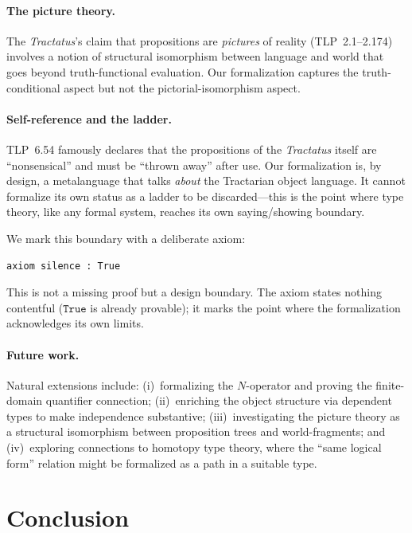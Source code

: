 \documentclass[10pt, letterpaper]{article}
\theoremstyle{definition}
\theoremstyle{remark}
\begin{document}
\paragraph{The picture theory.}
The \emph{Tractatus}'s claim that propositions are
\emph{pictures} of reality (TLP~2.1--2.174) involves a notion
of structural isomorphism between language and world that goes
beyond truth-functional evaluation.  Our formalization captures
the truth-conditional aspect but not the pictorial-isomorphism
aspect.

\paragraph{Self-reference and the ladder.}
TLP~6.54 famously declares that the propositions of the
\emph{Tractatus} itself are ``nonsensical'' and must be ``thrown
away'' after use.  Our formalization is, by design, a
metalanguage that talks \emph{about} the Tractarian object
language.  It cannot formalize its own status as a ladder to be
discarded---this is the point where type theory, like any formal
system, reaches its own saying/showing boundary.

We mark this boundary with a deliberate axiom:

\begin{lstlisting}
axiom silence : True
\end{lstlisting}

\noindent
This is not a missing proof but a design boundary.  The axiom
states nothing contentful ($\mathtt{True}$ is already provable);
it marks the point where the formalization acknowledges its own
limits.

\paragraph{Future work.}
Natural extensions include: (i)~formalizing the $N$-operator and
proving the finite-domain quantifier connection;
(ii)~enriching the object structure via dependent types to make
independence substantive; (iii)~investigating the picture theory
as a structural isomorphism between proposition trees and
world-fragments; and (iv)~exploring connections to homotopy type
theory, where the ``same logical form'' relation might be
formalized as a path in a suitable type.

\section{Conclusion}
\label{sec:conclusion}
\end{document}
